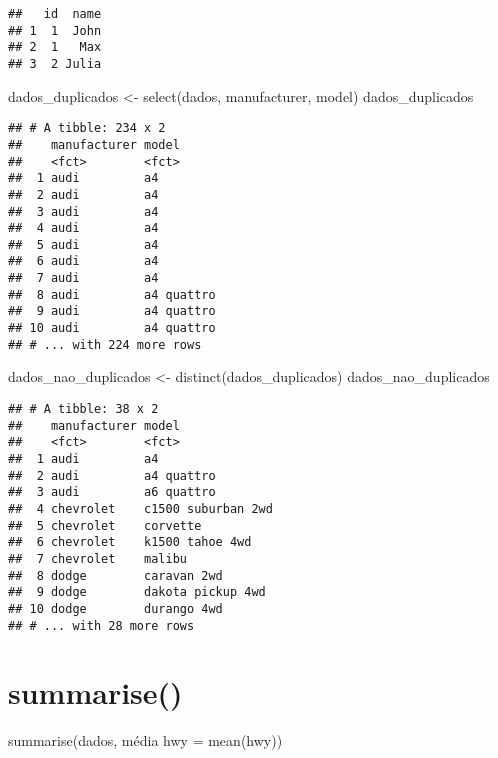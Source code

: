 \documentclass[
]{book}
\newenvironment{Shaded}{\begin{snugshade}}{\end{snugshade}}
\newcommand{\AttributeTok}[1]{\textcolor[rgb]{0.77,0.63,0.00}{#1}}
\newcommand{\FunctionTok}[1]{\textcolor[rgb]{0.00,0.00,0.00}{#1}}
\newcommand{\NormalTok}[1]{#1}
\newcommand{\OtherTok}[1]{\textcolor[rgb]{0.56,0.35,0.01}{#1}}
\newcommand{\StringTok}[1]{\textcolor[rgb]{0.31,0.60,0.02}{#1}}
\begin{document}
\begin{verbatim}
##   id  name
## 1  1  John
## 2  1   Max
## 3  2 Julia
\end{verbatim}

\begin{Shaded}
\begin{Highlighting}[]
\NormalTok{dados\_duplicados }\OtherTok{\textless{}{-}} \FunctionTok{select}\NormalTok{(dados, manufacturer, model)}
\NormalTok{dados\_duplicados}
\end{Highlighting}
\end{Shaded}

\begin{verbatim}
## # A tibble: 234 x 2
##    manufacturer model     
##    <fct>        <fct>     
##  1 audi         a4        
##  2 audi         a4        
##  3 audi         a4        
##  4 audi         a4        
##  5 audi         a4        
##  6 audi         a4        
##  7 audi         a4        
##  8 audi         a4 quattro
##  9 audi         a4 quattro
## 10 audi         a4 quattro
## # ... with 224 more rows
\end{verbatim}

\begin{Shaded}
\begin{Highlighting}[]
\NormalTok{dados\_nao\_duplicados }\OtherTok{\textless{}{-}} \FunctionTok{distinct}\NormalTok{(dados\_duplicados)}
\NormalTok{dados\_nao\_duplicados}
\end{Highlighting}
\end{Shaded}

\begin{verbatim}
## # A tibble: 38 x 2
##    manufacturer model             
##    <fct>        <fct>             
##  1 audi         a4                
##  2 audi         a4 quattro        
##  3 audi         a6 quattro        
##  4 chevrolet    c1500 suburban 2wd
##  5 chevrolet    corvette          
##  6 chevrolet    k1500 tahoe 4wd   
##  7 chevrolet    malibu            
##  8 dodge        caravan 2wd       
##  9 dodge        dakota pickup 4wd 
## 10 dodge        durango 4wd       
## # ... with 28 more rows
\end{verbatim}

\hypertarget{summarise}{%
\section{summarise()}\label{summarise}}

\begin{Shaded}
\begin{Highlighting}[]
\FunctionTok{summarise}\NormalTok{(dados, }\StringTok{\textasciigrave{}}\AttributeTok{média hwy}\StringTok{\textasciigrave{}} \OtherTok{=} \FunctionTok{mean}\NormalTok{(hwy))}
\end{Highlighting}
\end{Shaded}
\end{document}

